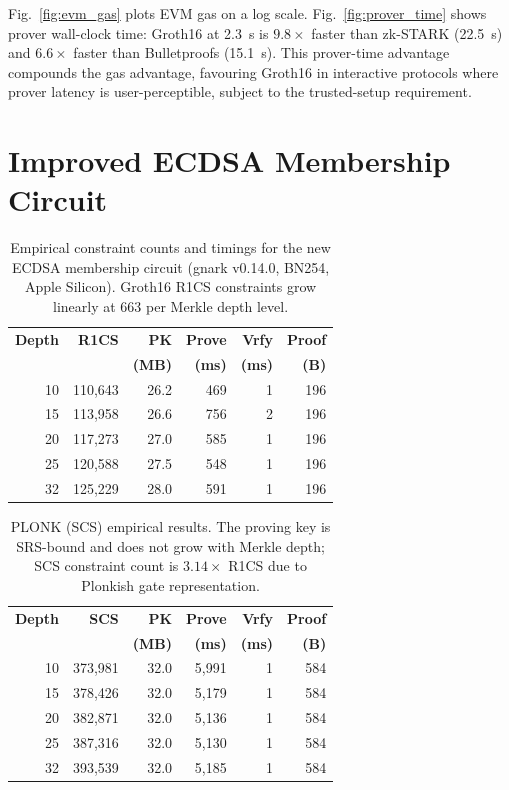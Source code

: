 \documentclass[conference]{IEEEtran}
\begin{document}
Fig.~\ref{fig:evm_gas} plots EVM gas on a log scale.
Fig.~\ref{fig:prover_time} shows prover wall-clock time: Groth16 at
2.3~s is $9.8\times$ faster than zk-STARK (22.5~s) and $6.6\times$ faster
than Bulletproofs (15.1~s).
This prover-time advantage compounds the gas advantage, favouring
Groth16 in interactive protocols where prover latency is
user-perceptible, subject to the trusted-setup requirement.

\section{Improved ECDSA Membership Circuit}
\label{sec:circuit}

\begin{table}[t]
\caption{Empirical constraint counts and timings for the new ECDSA
membership circuit (gnark v0.14.0, BN254, Apple Silicon).
Groth16 R1CS constraints grow linearly at 663 per Merkle depth level.}
\label{tab:groth16}
\centering\small
\begin{tabular}{rrrrrr}
\toprule
\textbf{Depth} & \textbf{R1CS} & \textbf{PK} & \textbf{Prove} & \textbf{Vrfy} & \textbf{Proof} \\
              &               & \textbf{(MB)} & \textbf{(ms)} & \textbf{(ms)} & \textbf{(B)} \\
\midrule
10 & 110,643 & 26.2 &  469 & 1 & 196 \\
15 & 113,958 & 26.6 &  756 & 2 & 196 \\
20 & 117,273 & 27.0 &  585 & 1 & 196 \\
25 & 120,588 & 27.5 &  548 & 1 & 196 \\
32 & 125,229 & 28.0 &  591 & 1 & 196 \\
\bottomrule
\end{tabular}
\end{table}

\begin{table}[t]
\caption{PLONK (SCS) empirical results. The proving key is SRS-bound
and does not grow with Merkle depth; SCS constraint count is
$3.14\times$ R1CS due to Plonkish gate representation.}
\label{tab:plonk}
\centering\small
\begin{tabular}{rrrrrr}
\toprule
\textbf{Depth} & \textbf{SCS} & \textbf{PK} & \textbf{Prove} & \textbf{Vrfy} & \textbf{Proof} \\
              &              & \textbf{(MB)} & \textbf{(ms)} & \textbf{(ms)} & \textbf{(B)} \\
\midrule
10 & 373,981 & 32.0 & 5,991 & 1 & 584 \\
15 & 378,426 & 32.0 & 5,179 & 1 & 584 \\
20 & 382,871 & 32.0 & 5,136 & 1 & 584 \\
25 & 387,316 & 32.0 & 5,130 & 1 & 584 \\
32 & 393,539 & 32.0 & 5,185 & 1 & 584 \\
\bottomrule
\end{tabular}
\end{table}
\end{document}
